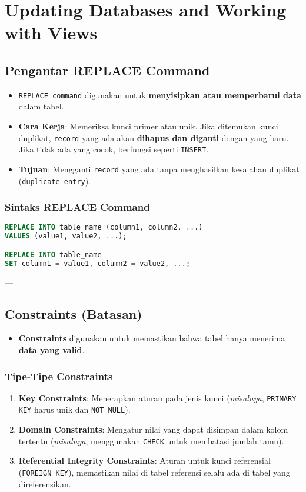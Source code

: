 \documentclass{article}
\begin{document}
\newpage
\section{Updating Databases and Working with Views}
\subsection{Pengantar REPLACE Command}
\begin{itemize}
    \item \texttt{REPLACE command} digunakan untuk \textbf{menyisipkan atau memperbarui data} dalam tabel.
    \item \textbf{Cara Kerja}: Memeriksa kunci primer atau unik. Jika ditemukan kunci duplikat, \texttt{record} yang ada akan \textbf{dihapus dan diganti} dengan yang baru. Jika tidak ada yang cocok, berfungsi seperti \texttt{INSERT}.
    \item \textbf{Tujuan}: Mengganti \texttt{record} yang ada tanpa menghasilkan kesalahan duplikat (\texttt{duplicate entry}).
\end{itemize}

\subsubsection{Sintaks REPLACE Command}
\begin{lstlisting}[language=SQL, caption={Sintaks REPLACE Command}, captionpos=b]
REPLACE INTO table_name (column1, column2, ...)  
VALUES (value1, value2, ...);

REPLACE INTO table_name  
SET column1 = value1, column2 = value2, ...;
\end{lstlisting}

---

\subsection{Constraints (Batasan)}
\begin{itemize}
    \item \textbf{Constraints} digunakan untuk memastikan bahwa tabel hanya menerima \textbf{data yang valid}.
\end{itemize}

\subsubsection{Tipe-Tipe Constraints}
\begin{enumerate}
    \item \textbf{Key Constraints}: Menerapkan aturan pada jenis kunci (\textit{misalnya}, \texttt{PRIMARY KEY} harus unik dan \texttt{NOT NULL}).
    \item \textbf{Domain Constraints}: Mengatur nilai yang dapat disimpan dalam kolom tertentu (\textit{misalnya}, menggunakan \texttt{CHECK} untuk membatasi jumlah tamu).
    \item \textbf{Referential Integrity Constraints}: Aturan untuk kunci referensial (\texttt{FOREIGN KEY}), memastikan nilai di tabel referensi selalu ada di tabel yang direferensikan.
\end{enumerate}
\end{document}
